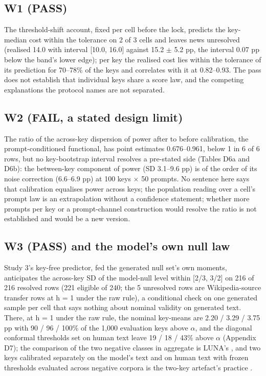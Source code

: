 \documentclass[11pt,letterpaper]{article}
\begin{document}
\hypertarget{w1-pass}{%
\subsection{W1 (PASS)}\label{w1-pass}}

The threshold-shift account, fixed per cell before the lock, predicts the key-median cost within the tolerance on 2 of 3 cells and leaves news unresolved (realised 14.0 with interval {[}10.0, 16.0{]} against 15.2 \ensuremath{\pm} 5.2 pp, the interval 0.07 pp below the band's lower edge); per key the realised cost lies within the tolerance of its prediction for 70--78\% of the keys and correlates with it at 0.82--0.93. The pass does not establish that individual keys share a score law, and the competing explanations the protocol names are not separated.

\hypertarget{w2-fail-a-stated-design-limit}{%
\subsection{W2 (FAIL, a stated design limit)}\label{w2-fail-a-stated-design-limit}}

The ratio of the across-key dispersion of power after to before calibration, the prompt-conditioned functional, has point estimates 0.676--0.961, below 1 in 6 of 6 rows, but no key-bootstrap interval resolves a pre-stated side (Tables D6a and D6b): the between-key component of power (SD 3.1--9.6 pp) is of the order of its noise correction (6.6--6.9 pp) at 100 keys \ensuremath{\times} 50 prompts. No sentence here says that calibration equalises power across keys; the population reading over a cell's prompt law is an extrapolation without a confidence statement; whether more prompts per key or a prompt-channel construction would resolve the ratio is not established and would be a new version.

\hypertarget{w3-pass-and-the-models-own-null-law}{%
\subsection{W3 (PASS) and the model's own null law}\label{w3-pass-and-the-models-own-null-law}}

Study 3's key-free predictor, fed the generated null set's own moments, anticipates the across-key SD of the model-null level within {[}2/3, 3/2{]} on 216 of 216 resolved rows (221 eligible of 240; the 5 unresolved rows are Wikipedia-source transfer rows at h = 1 under the raw rule), a conditional check on one generated sample per cell that says nothing about nominal validity on generated text. There, at h = 1 under the raw rule, the nominal key-means are 2.20 / 3.29 / 3.75 pp with 90 / 96 / 100\% of the 1,000 evaluation keys above \ensuremath{\alpha}, and the diagonal conformal thresholds set on human text leave 19 / 18 / 43\% above \ensuremath{\alpha} (Appendix D7); the comparison of the two negative classes in aggregate is LUNA's \citep{park2026luna}, and two keys calibrated separately on the model's text and on human text with frozen thresholds evaluated across negative corpora is the two-key artefact's practice \citep{xlr8harder2026synthid}.
\end{document}
